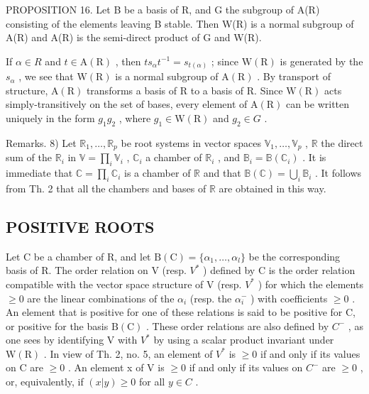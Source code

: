 PROPOSITION 16. Let B be a basis of R, and G the subgroup of A(R) consisting of the elements leaving B stable. Then W(R) is a normal subgroup of A(R) and A(R) is the semi-direct product of G and W(R).

If \(\alpha\in R\) and \(t\in\mathrm{A}(\mathrm{R})\) , then \(ts_{\alpha}t^{-1}=s_{t(\alpha)}\) ; since \(\mathrm{W}(\mathrm{R})\) is generated by the \(s_{\alpha}\) , we see that \(\mathrm{W}(\mathrm{R})\) is a normal subgroup of \(\mathrm{A}(\mathrm{R})\) . By transport of structure, \(\mathrm{A}(\mathrm{R})\) transforms a basis of R to a basis of R. Since \(\mathrm{W}(\mathrm{R})\) acts simply-transitively on the set of bases, every element of \(\mathrm{A}(\mathrm{R})\) can be written uniquely in the form \(g_{1}g_{2}\) , where \(g_{1}\in\mathrm{W}(\mathrm{R})\) and \(g_{2}\in G\) .

Remarks. 8) Let \(\mathbb{R}_1, \ldots, \mathbb{R}_p\) be root systems in vector spaces \(\mathbb{V}_1, \ldots, \mathbb{V}_p\) , \(\mathbb{R}\) the direct sum of the \(\mathbb{R}_i\) in \(\mathbb{V} = \prod_i \mathbb{V}_i\) , \(\mathbb{C}_i\) a chamber of \(\mathbb{R}_i\) , and \(\mathbb{B}_i = \mathbb{B}(\mathbb{C}_i)\) . It is immediate that \(\mathbb{C} = \prod_i \mathbb{C}_i\) is a chamber of \(\mathbb{R}\) and that \(\mathbb{B}(\mathbb{C}) = \bigcup_i \mathbb{B}_i\) . It follows from Th. 2 that all the chambers and bases of \(\mathbb{R}\) are obtained in this way.

\subsection{POSITIVE ROOTS}

Let C be a chamber of R, and let \(\mathrm{B}(\mathrm{C})=\{\alpha_{1},\ldots,\alpha_{l}\}\) be the corresponding basis of R. The order relation on V (resp. \(V^{*}\) ) defined by C is the order relation compatible with the vector space structure of V (resp. \(V^{*}\) ) for which the elements \(\geqslant0\) are the linear combinations of the \(\alpha_{i}\) (resp. the \(\alpha_{i}^{-}\) ) with coefficients \(\geqslant0\) . An element that is positive for one of these relations is said to be positive for C, or positive for the basis \(\mathrm{B}(\mathrm{C})\) . These order relations are also defined by \(C^{-}\) , as one sees by identifying V with \(V^{*}\) by using a scalar product invariant under \(\mathrm{W}(\mathrm{R})\) . In view of Th. 2, no. 5, an element of \(V^{*}\) is \(\geqslant0\) if and only if its values on C are \(\geqslant0\) . An element x of V is \(\geqslant0\) if and only if its values on \(C^{-}\) are \(\geqslant0\) , or, equivalently, if \((x|y)\geqslant0\) for all \(y\in C\) .


